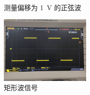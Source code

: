 \documentclass[a4paper,utf8]{article}
\begin{document}
    \begin{figure}[!ht]
        \hspace{6mm}
        \caption{测量偏移为 \SI{1}{\V} 的正弦波\label{fig:8.2}}
    \end{figure}\par
    \begin{figure}[!ht]
        \includegraphics[width=0.4\textwidth]{3.jpg}
        \caption{矩形波信号\label{fig:8.4}}
    \end{figure}\par
    \begin{figure}[!ht]
        \begin{floatrow}
        \end{floatrow}
    \end{figure}\par
\end{document}
